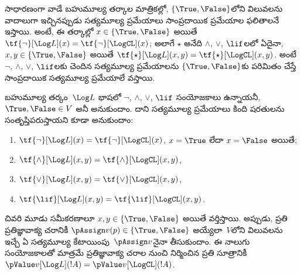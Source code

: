 \documentclass[../../../include/open-logic-section]{subfiles}
\begin{document}


సాధారణంగా వాడే బహుమూల్య తర్కాల మాత్రికల్లో, $\{\True, \False\}$లోని
విలువలను వాదాలుగా ఇచ్చినప్పుడు సత్యమూల్య ప్రమేయాలు సాంప్రదాయిక ప్రమేయాల
ఫలితాలనే ఇస్తాయి. అంటే, ఈ తర్కాల్లో
$x \in \{\True, \False\}$ అయితే $\tf{\lnot}[\Log L](x) =
\tf{\lnot}[\LogCL](x)$; అలాగే $\star$ అనేది $\land$, $\lor$,
$\lif$లలో ఏదైనా, $x, y \in \{\True, \False\}$ అయితే
$\tf{\star}[\Log L](x,y) = \tf{\star}[\LogCL](x,y)$.
అంటే $\lnot$, $\land$, $\lor$, $\lif$లకు చెందిన
సత్యమూల్య ప్రమేయాలను $\{\True,\False\}$కు పరిమితం చేస్తే
సాంప్రదాయిక సత్యమూల్య ప్రమేయాలే వస్తాయి.

\begin{prop}
  బహుమూల్య తర్కం~$\Log L$ భాషలో $\lnot$, $\land$, $\lor$,
  $\lif$ సంయోజకాలు ఉన్నాయనీ, $\True, \False \in
  V$ అనీ అనుకుందాం. దాని సత్యమూల్య ప్రమేయాలు కింది షరతులను
  సంతృప్తిపరుస్తాయని కూడా అనుకుందాం:
  \begin{enumerate}
    \item{} $\tf{\lnot}[\Log L](x) = \tf{\lnot}[\LogCL](x)$, $x =
    \True$ లేదా $x = \False$ అయితే;
    \item{} $\tf{\land}[\Log L](x,y) = \tf{\land}[\LogCL](x,y)$,
    \item{} $\tf{\lor}[\Log L](x,y) = \tf{\lor}[\LogCL](x,y)$,
    \item{} $\tf{\lif}[\Log L](x,y) = \tf{\lif}[\LogCL](x,y)$.
  \end{enumerate}
  చివరి మూడు సమీకరణాలూ $x, y \in \{\True, \False\}$ అయితే వర్తిస్తాయి.
  అప్పుడు, ప్రతి ప్రతిజ్ఞావాక్య చరానికీ $\pAssign
  v(p) \in \{\True,\False\}$ అయ్యేలా~$V$లోని విలువలను ఇచ్చే
ఏ సత్యమూల్య కేటాయింపు~$\pAssign v$నైనా తీసుకుందాం. ఈ నాలుగు
  సంయోజకాలతో మాత్రమే ప్రతిజ్ఞావాక్య చరాల నుంచి నిర్మించిన
  ప్రతి సూత్రానికీ $\pValue v[\Log L](!A) = \pValue
  v[\LogCL](!A)$.
\end{prop}
\end{document}
